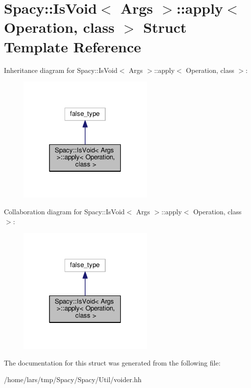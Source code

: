 \hypertarget{structSpacy_1_1IsVoid_1_1apply}{}\section{Spacy\+:\+:Is\+Void$<$ Args $>$\+:\+:apply$<$ Operation, class $>$ Struct Template Reference}
\label{structSpacy_1_1IsVoid_1_1apply}


Inheritance diagram for Spacy\+:\+:Is\+Void$<$ Args $>$\+:\+:apply$<$ Operation, class $>$\+:
\nopagebreak
\begin{figure}[H]
\begin{center}
\leavevmode
\includegraphics[width=189pt]{structSpacy_1_1IsVoid_1_1apply__inherit__graph}
\end{center}
\end{figure}


Collaboration diagram for Spacy\+:\+:Is\+Void$<$ Args $>$\+:\+:apply$<$ Operation, class $>$\+:
\nopagebreak
\begin{figure}[H]
\begin{center}
\leavevmode
\includegraphics[width=189pt]{structSpacy_1_1IsVoid_1_1apply__coll__graph}
\end{center}
\end{figure}


The documentation for this struct was generated from the following file\+:\begin{DoxyCompactItemize}
\item 
/home/lars/tmp/\+Spacy/\+Spacy/\+Util/voider.\+hh\end{DoxyCompactItemize}
